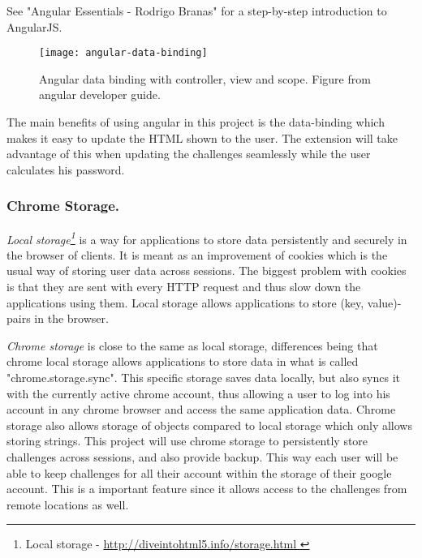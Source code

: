 See "Angular Essentials - Rodrigo Branas"\cite{angularjs-book} for a step-by-step introduction to AngularJS.

\begin{figure}[h]
    \texttt{[image: angular-data-binding]} 
    \caption{Angular data binding with controller, view and scope. Figure from angular developer guide.}
    \label{angular-data-binding}
\end{figure}


\par The main benefits of using angular in this project is the data-binding which makes it easy to update the HTML shown to the user. The extension will take advantage of this when updating the challenges seamlessly while the user calculates his password.

\subsubsection{Chrome Storage.}
\emph{Local storage\footnote{Local storage - \url{ http://diveintohtml5.info/storage.html }}} is a way for applications to store data persistently and securely in the browser of clients. It is meant as an improvement of cookies which is the usual way of storing user data across sessions. The biggest problem with cookies is that they are sent with every HTTP request and thus slow down the applications using them. Local storage allows applications to store (key, value)-pairs in the browser. 
\par \emph{Chrome storage} is close to the same as local storage, differences being that chrome local storage allows applications to store data in what is called "chrome.storage.sync". This specific storage saves data locally, but also syncs it with the currently active chrome account, thus allowing a user to log into his account in any chrome browser and access the same application data. Chrome storage also allows storage of objects compared to local storage which only allows storing strings. This project will use chrome storage to persistently store challenges across sessions, and also provide backup. This way each user will be able to keep challenges for all their account within the storage of their google account. This is a important feature since it allows access to the challenges from remote locations as well.

